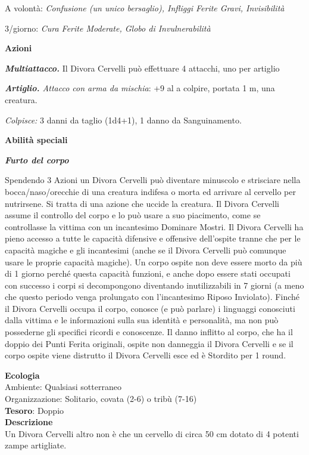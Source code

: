 \begin{multicols}{2}
A volontà: \textit{Confusione (un unico bersaglio), Infliggi Ferite Gravi, Invisibilità}

3/giorno: \textit{Cura Ferite Moderate, Globo di Invulnerabilità}

\textbf{Azioni}

\textit{\textbf{Multiattacco.}} Il Divora Cervelli può effettuare 4 attacchi, uno per artiglio

\textit{\textbf{Artiglio.} Attacco con arma da mischia}: +9 al a colpire, portata 1 m, una creatura.

\textit{Colpisce:} 3 danni da taglio (1d4+1), 1 danno da Sanguinamento.

\textbf{Abilità speciali}

\textit{\textbf{Furto del corpo}}

Spendendo 3 Azioni un Divora Cervelli può diventare minuscolo e strisciare nella bocca/naso/orecchie di una creatura indifesa o morta ed arrivare al cervello per nutrirsene. Si tratta di una azione che uccide la creatura. Il Divora Cervelli assume il controllo del corpo e lo può usare a suo piacimento, come se controllasse la vittima con un incantesimo Dominare Mostri. Il Divora Cervelli ha pieno accesso a tutte le capacità difensive e offensive dell’ospite tranne che per le capacità magiche e gli incantesimi (anche se il Divora Cervelli può comunque usare le proprie capacità magiche). Un corpo ospite non deve essere morto da più di 1 giorno perché questa capacità funzioni, e anche dopo essere stati occupati con successo i corpi si decompongono diventando inutilizzabili in 7 giorni (a meno che questo periodo venga prolungato con l'incantesimo Riposo Inviolato). Finché il Divora Cervelli occupa il corpo, conosce (e può parlare) i linguaggi conosciuti dalla vittima e le informazioni sulla sua identità e personalità, ma non può possederne gli specifici ricordi e conoscenze. Il danno inflitto al corpo, che ha il doppio dei Punti Ferita originali, ospite non danneggia il Divora Cervelli e se il corpo ospite viene distrutto il Divora Cervelli esce ed è Stordito per 1 round.

\textbf{Ecologia}\\
Ambiente: Qualsiasi sotterraneo\\
Organizzazione: Solitario, covata (2-6) o tribù (7-16)\\
\textbf{Tesoro}: Doppio\\
\textbf{Descrizione}\\
Un Divora Cervelli altro non è che un cervello di circa 50 cm dotato di 4 potenti zampe artigliate.


\end{multicols}

